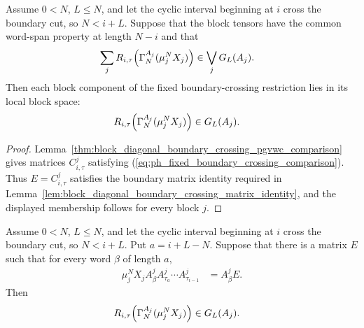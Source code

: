 \begin{lemma}
    \label{thm:block_diagonal_boundary_crossing_component_mem_ground_space}
    \leanok
    Assume $0<N$, $L\le N$, and let the cyclic interval beginning at $i$
    cross the boundary cut, so $N<i+L$. Suppose that the block tensors have
    the common word-span property at length $N-i$ and that
    \begin{align}
        \sum_j
        R_{i,\tau}\!\left(\Gamma_N^{A_j}(\mu_j^NX_j)\right)
         & \in\bigvee_jG_L(A_j).
        \notag
    \end{align}
    Then each block component of the fixed boundary-crossing restriction lies
    in its local block space:
    \begin{align}
        R_{i,\tau}\!\left(\Gamma_N^{A_j}(\mu_j^NX_j)\right)
         & \in G_L(A_j).
        \notag
    \end{align}
\end{lemma}

\begin{proof}
    \leanok
    Lemma~\ref{thm:block_diagonal_boundary_crossing_pgvwc_comparison}
    gives matrices $C^j_{i,\tau}$ satisfying
    (\ref{eq:ph_fixed_boundary_crossing_comparison}). Thus
    $E=C^j_{i,\tau}$ satisfies the boundary matrix identity required in
    Lemma~\ref{lem:block_diagonal_boundary_crossing_matrix_identity}, and the
    displayed membership follows for every block $j$.
\end{proof}

\begin{lemma}
    \label{lem:block_diagonal_boundary_crossing_matrix_identity}
    \leanok
    Assume $0<N$, $L\le N$, and let the cyclic interval beginning at $i$
    cross the boundary cut, so $N<i+L$. Put $a=i+L-N$. Suppose that there is
    a matrix $E$ such that for every word $\beta$ of length $a$,
    \begin{align}
        \mu_j^N X_j A^j_\beta
        A^j_{\tau_a}\cdots A^j_{\tau_{i-1}}
         & =
        A^j_\beta E.
        \label{eq:ph_boundary_crossing_matrix_identity}
    \end{align}
    Then
    \begin{align}
        R_{i,\tau}\!\left(\Gamma_N^{A_j}(\mu_j^NX_j)\right)
         & \in G_L(A_j).
        \notag
    \end{align}
\end{lemma}

